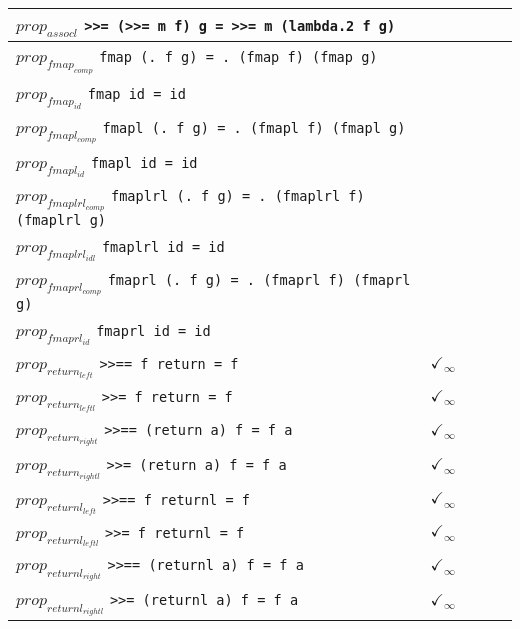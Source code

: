 \documentclass{article}
\begin{document}
\begin{longtable}{p{10cm} || c | c | c | c | }
\hline
$prop_{assocl}$ \newline \verb`>>= (>>= m f) g = >>= m (lambda.2 f g)` &  &  &  &  \\
\hline
$prop_{fmap_{comp}}$ \newline \verb`fmap (. f g) = . (fmap f) (fmap g)` &  &  &  &  \\
\hline
$prop_{fmap_{id}}$ \newline \verb`fmap id = id` &  &  &  &  \\
\hline
$prop_{fmapl_{comp}}$ \newline \verb`fmapl (. f g) = . (fmapl f) (fmapl g)` &  &  &  &  \\
\hline
$prop_{fmapl_{id}}$ \newline \verb`fmapl id = id` &  &  &  &  \\
\hline
$prop_{fmaplrl_{comp}}$ \newline \verb`fmaplrl (. f g) = . (fmaplrl f) (fmaplrl g)` &  &  &  &  \\
\hline
$prop_{fmaplrl_{idl}}$ \newline \verb`fmaplrl id = id` &  &  &  &  \\
\hline
$prop_{fmaprl_{comp}}$ \newline \verb`fmaprl (. f g) = . (fmaprl f) (fmaprl g)` &  &  &  &  \\
\hline
$prop_{fmaprl_{id}}$ \newline \verb`fmaprl id = id` &  &  &  &  \\
\hline
$prop_{return_{left}}$ \newline \verb`>>== f return = f` & $\checkmark_{\infty}$ &  &  &  \\
\hline
$prop_{return_{leftl}}$ \newline \verb`>>= f return = f` & $\checkmark_{\infty}$ &  &  &  \\
\hline
$prop_{return_{right}}$ \newline \verb`>>== (return a) f = f a` & $\checkmark_{\infty}$ &  &  &  \\
\hline
$prop_{return_{rightl}}$ \newline \verb`>>= (return a) f = f a` & $\checkmark_{\infty}$ &  &  &  \\
\hline
$prop_{returnl_{left}}$ \newline \verb`>>== f returnl = f` & $\checkmark_{\infty}$ &  &  &  \\
\hline
$prop_{returnl_{leftl}}$ \newline \verb`>>= f returnl = f` & $\checkmark_{\infty}$ &  &  &  \\
\hline
$prop_{returnl_{right}}$ \newline \verb`>>== (returnl a) f = f a` & $\checkmark_{\infty}$ &  &  &  \\
\hline
$prop_{returnl_{rightl}}$ \newline \verb`>>= (returnl a) f = f a` & $\checkmark_{\infty}$ &  &  &  \\
\end{longtable}
\end{document}
